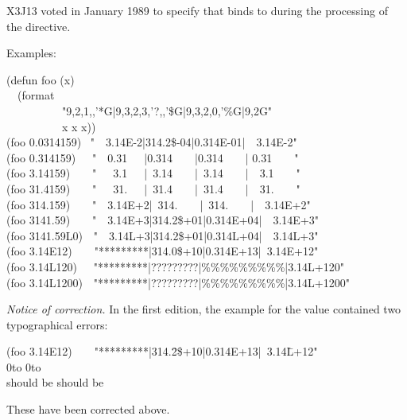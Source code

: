 \begin{flushdesc}
\begin{new}
X3J13 voted in January 1989
to specify that  binds  to 
during the processing of the  directive.
\end{new}
\begin{obsolete}
Examples:
\begin{lisp}
(defun foo (x) \\
~~(format {\nil} \\
~~~~~~~~~~"{\Xtilde}9,2,1,,'*G|{\Xtilde}9,3,2,3,'?,,'\$G|{\Xtilde}9,3,2,0,'\%G|{\Xtilde}9,2G" \\
~~~~~~~~~~x x x)) \\[10pt]
(foo 0.0314159) \EV\ "~~3.14E-2|314.2\$-04|0.314E-01|~~3.14E-2" \\
(foo 0.314159)~~\EV\ "~~0.31~~~|0.314~~~~|0.314~~~~| 0.31~~~~" \\
(foo 3.14159)~~~\EV\ "~~~3.1~~~|~3.14~~~~|~3.14~~~~|~~3.1~~~~" \\
(foo 31.4159)~~~\EV\ "~~~31.~~~|~31.4~~~~|~31.4~~~~|~~31.~~~~" \\
(foo 314.159)~~~\EV\ "~~3.14E+2|~314.~~~~|~314.~~~~|~~3.14E+2" \\
(foo 3141.59)~~~\EV\ "~~3.14E+3|314.2\$+01|0.314E+04|~~3.14E+3" \\
(foo 3141.59L0)~\EV\ "~~3.14L+3|314.2\$+01|0.314L+04|~~3.14L+3" \\
(foo 3.14E12)~~~\EV\ "*********|314.0\$+10|0.314E+13|~3.14E+12" \\
(foo 3.14L120)~~\EV\ "*********|?????????|\%\%\%\%\%\%\%\%\%|3.14L+120" \\
(foo 3.14L1200)~\EV\ "*********|?????????|\%\%\%\%\%\%\%\%\%|3.14L+1200"
\end{lisp}
\end{obsolete}
\newpage%
\begin{new}%
\emph{Notice of correction.}
In the first edition, the example for the value  contained two
typographical errors:
\begin{lisp}
(foo 3.14E12)~~~\EV\ "*********|314.\=2\$+10|0.314E+13|~3.14\=L+12" \\
\>\hbox{0}\hbox to \>\hbox{0}\hbox to  \\
\>\textrm{should be }\>\textrm{should be }
\end{lisp}
These have been corrected above.
\end{new}


\end{flushdesc}
